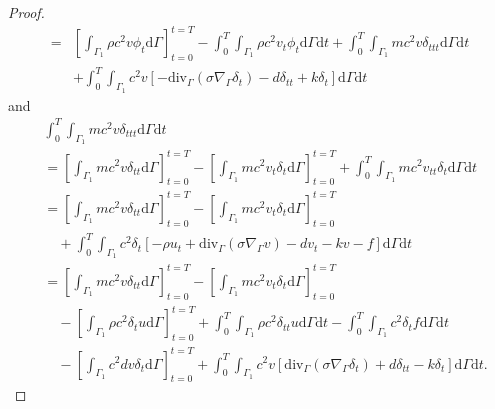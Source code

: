\documentclass[10pt,a4paper]{amsart}
\begin{document}
\begin{proof}
\begin{equation}
\begin{split}
=&\left[\int_{\Gamma_1}\rho c^{2}v  {\phi_t}\mathrm{d}\Gamma\right]_{t=0}^{t=T} - \int_{0}^{T}\int_{\Gamma_1}\rho c^{2}v_{t}  {\phi_t}\mathrm{d}\Gamma \mathrm{d}t + \int_{0}^{T}\int_{\Gamma_1}m c^{2}v  {\delta}_{ttt}\mathrm{d}\Gamma \mathrm{d}t \\
&+\int_{0}^{T}\int_{\Gamma_1}c^{2}v\left[- \mathrm{div}_{\Gamma}\left(\sigma\nabla_{\Gamma} {\delta_t}\right)  - d {\delta}_{tt} + k {\delta_t} \right]\mathrm{d}\Gamma \mathrm{d}t
\end{split}
\end{equation}
and
\begin{equation} \label{explicit_3}
\begin{split}
 &\int_{0}^{T}\int_{\Gamma_1}m c^{2}v {\delta}_{ttt}\mathrm{d}\Gamma \mathrm{d}t \\
 &= \left[\int_{\Gamma_1}m c^{2}v  {\delta}_{tt}\mathrm{d}\Gamma\right]_{t=0}^{t=T} - \left[\int_{\Gamma_1}m c^{2}v_{t}  {\delta_t}\mathrm{d}\Gamma\right]_{t=0}^{t=T} + \int_{0}^{T}\int_{\Gamma_1}m c^{2}v_{tt}  {\delta_t}\mathrm{d}\Gamma \mathrm{d}t\\
 &= \left[\int_{\Gamma_1}m c^{2}v  {\delta}_{tt}\mathrm{d}\Gamma\right]_{t=0}^{t=T} - \left[\int_{\Gamma_1}m c^{2}v_{t}  {\delta_t}\mathrm{d}\Gamma\right]_{t=0}^{t=T} \\
 &\quad+ \int_{0}^{T}\int_{\Gamma_1} c^{2}  {\delta_t}\left[ -\rho u_{t} + \mathrm{div}_{\Gamma}\left(\sigma\nabla_{\Gamma} {v}\right) -d v_{t} - k v - f\right]\mathrm{d}\Gamma \mathrm{d}t\\
  &=  \left[\int_{\Gamma_1}m c^{2}v  {\delta}_{tt}\mathrm{d}\Gamma\right]_{t=0}^{t=T} - \left[\int_{\Gamma_1}m c^{2}v_{t}  {\delta_t}\mathrm{d}\Gamma\right]_{t=0}^{t=T} \\
  &\quad -\left[\int_{\Gamma_1}\rho c^{2}  {\delta_t} u\mathrm{d}\Gamma\right]_{t=0}^{t=T} + \int_{0}^{T}\int_{\Gamma_1}\rho c^{2}  {\delta}_{tt} u\mathrm{d}\Gamma \mathrm{d}t - \int_{0}^{T}\int_{\Gamma_1}c^{2}\delta_t f\mathrm{d}\Gamma \mathrm{d}t\\
 &\quad -\left[\int_{\Gamma_1} c^{2} d {v}\delta_t\mathrm{d}\Gamma \right]_{t=0}^{t=T}+ \int_{0}^{T}\int_{\Gamma_1} c^{2}  {v}\left[ \mathrm{div}_{\Gamma}\left(\sigma\nabla_{\Gamma} {\delta_t}\right) + d \delta_{tt} - k \delta_t\right]\mathrm{d}\Gamma \mathrm{d}t.
 \end{split}
\end{equation}


\end{proof}
\end{document}
